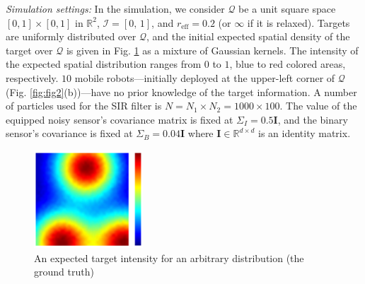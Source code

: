 \documentclass[letterpaper, 10 pt, conference]{ieeeconf}
\begin{document}
\textit{Simulation settings:}
In the simulation, we consider  $\mathcal{Q}$ be a unit square space $[0,1]\times [0,1]$ in $\mathbb{R}^2$, $\mathcal{I} = [0,\,1]$, and $r_{\text{eff}} =0.2$ (or $\infty$ if it is relaxed). Targets are uniformly distributed over $\mathcal{Q}$, and the initial expected spatial density of the target over $\mathcal{Q}$ is given in Fig. \ref{fig:fig1} as a mixture of Gaussian kernels. The intensity of the expected spatial distribution ranges from $0$ to $1$, blue to red colored areas, respectively.
$10$ mobile robots---initially deployed at the upper-left corner of $\mathcal{Q}$ (Fig. \ref{fig:fig2}(b))---have no prior knowledge of the target information.
A number of particles used for the SIR filter is $N= N_1\times N_2 = 1000 \times 100$. The value of the equipped noisy sensor's covariance matrix is fixed at $\Sigma_I = 0.5\mathbf{I}$, and the binary sensor's covariance is fixed at $\Sigma_B = 0.04\mathbf{I}$ where $\mathbf{I} \in \mathbb{R}^{d\times d}$ is an identity matrix.
\begin{figure}
	\centering
	\includegraphics[width=1.6in]{figure/init_10_deploy_c_mod}
	\caption{An expected target intensity for an arbitrary distribution (the ground truth)} 
	\label{fig:fig1}
\end{figure}
\end{document}
